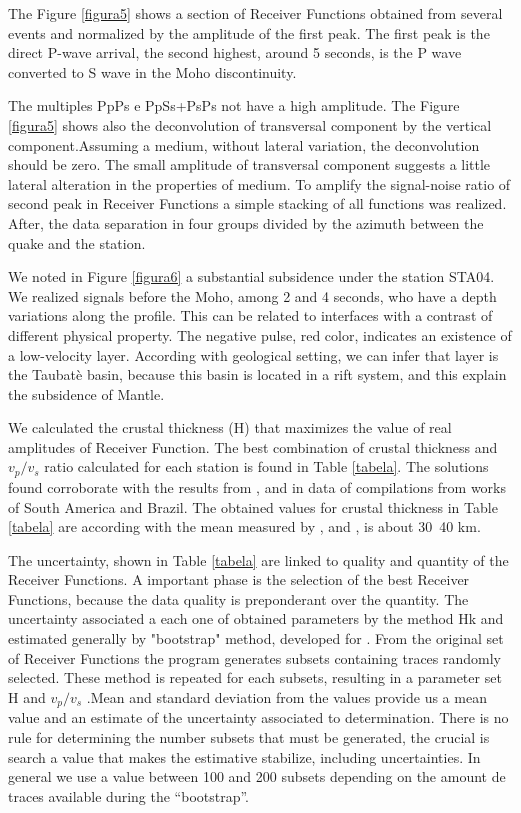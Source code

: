 The Figure \ref{figura5} shows a section of Receiver Functions obtained from several events and normalized by the amplitude of the first peak. The first peak is the direct P-wave arrival, the second highest, around 5 seconds, is the P wave converted to S wave in the Moho discontinuity. 



The multiples PpPs e PpSs+PsPs not have a high amplitude. The Figure \ref{figura5} shows also the deconvolution of transversal component by the vertical component.Assuming a medium, without lateral variation, the deconvolution should be zero. The small amplitude of transversal component suggests a little lateral alteration in the properties of medium. To amplify the signal-noise ratio of second peak in Receiver Functions a simple stacking of all functions was realized. After, the data separation in four groups divided by the azimuth between the quake and the station. 

We noted in Figure \ref{figura6} a substantial subsidence under the station STA04. We realized signals before the Moho, among 2 and 4 seconds, who have a depth variations along the profile. This can be related to interfaces with a contrast of different physical property. The negative pulse, red color, indicates an existence of a low-velocity layer. According with geological setting, we can infer that layer is the Taubat\`{e} basin, because this basin is located in a rift system, and this explain the subsidence of Mantle.

We calculated the crustal thickness (H) that maximizes the value of real amplitudes of Receiver Function. The best combination of crustal thickness and $v_{p}/v_{s}$ ratio calculated for each station is found in Table \ref{tabela}. The solutions found corroborate with the results from \cite{assumpcao_models_2013}, \cite{assumpcao_crustal_2013} and \cite{van_der_meijde_gravity_2013} in data of compilations from works of South America and Brazil. The obtained values for crustal thickness in Table \ref{tabela} are according with the mean measured by \cite{assumpcao_models_2013}, \cite{assumpcao_crustal_2013} and \cite{van_der_meijde_gravity_2013}, is about 30~40 km.


The uncertainty, shown in Table \ref{tabela} are linked to quality and quantity of the Receiver Functions. A important phase is the selection of the best Receiver Functions, because the data quality is preponderant over the quantity. The uncertainty associated a each one of obtained parameters by the method Hk and estimated generally by "bootstrap" method, developed for  \citep{efron_statistical_1991}. From the original set of Receiver Functions the program generates subsets containing traces randomly selected. These method is repeated for each subsets, resulting in a parameter set H and $v_{p}/v_{s}$ .Mean and standard deviation from the values provide us a mean value and an estimate of the uncertainty associated to determination. There is no rule for determining the number subsets that must be generated, the crucial is search a value that makes the estimative stabilize,  including uncertainties. In general we use a value between 100 and 200 subsets depending on the amount de traces available during the “bootstrap”.

